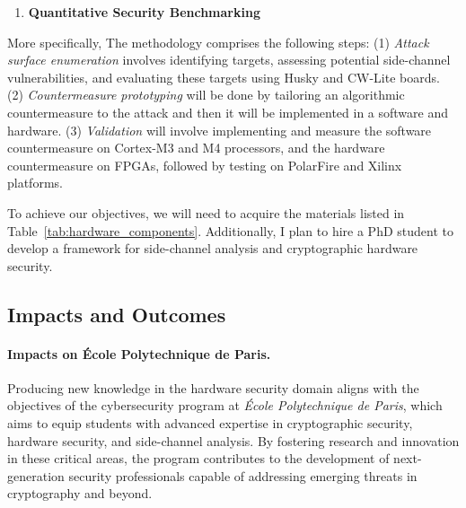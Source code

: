 \documentclass[11pt, a4paper]{article}
\begin{document}
\begin{enumerate}[leftmargin=*, label=\textbf{\arabic*.}, series=main]
    \item \textbf{Quantitative Security Benchmarking}
    \begin{center}
    \end{center}
\end{enumerate}

More specifically, The methodology comprises the following steps:
(1) \textit{Attack surface enumeration} involves identifying targets, assessing potential 
side-channel vulnerabilities, and evaluating these targets 
using Husky and CW-Lite boards.
(2) \textit{Countermeasure prototyping} will be done by tailoring an algorithmic countermeasure to the 
attack and then it will be implemented in a software and hardware. 
(3) \textit{Validation} will involve implementing and measure the software countermeasure on 
Cortex-M3 and M4 processors, and the hardware countermeasure on FPGAs, 
followed by testing on PolarFire and Xilinx platforms.

To achieve our objectives, we will need to acquire the materials 
listed in Table~\ref{tab:hardware_components}. Additionally, I 
plan to hire a PhD student to develop a framework for side-channel 
analysis and cryptographic hardware security.

\subsection*{Impacts and Outcomes}

\paragraph{Impacts on \'Ecole Polytechnique de Paris.} 
Producing new knowledge in the hardware security domain aligns with the objectives of the cybersecurity 
program at \emph{École Polytechnique de Paris}, which aims to equip students with advanced 
expertise in cryptographic security, hardware security, and side-channel analysis. By fostering 
research and innovation in these critical areas, the program contributes to the development of 
next-generation security professionals capable of addressing emerging threats in cryptography 
and beyond.
\end{document}
